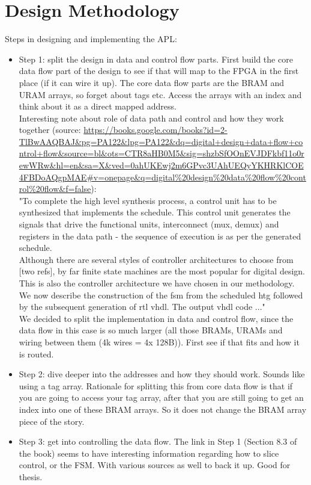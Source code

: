 \newpage
\section{Design Methodology}

Steps in designing and implementing the APL:
\begin{itemize}
	\item Step 1: split the design in data and control flow parts. First build the core data flow part of the design to see if that will map to the FPGA in the first place (if it can wire it up). The core data flow parts are the BRAM and URAM arrays, so forget about tags etc. Access the arrays with an index and think about it as a direct mapped address.\\

	Interesting note about role of data path and control and how they work together (source: \url{https://books.google.com/books?id=2-TlBwAAQBAJ&pg=PA122&lpg=PA122&dq=digital+design+data+flow+control+flow&source=bl&ots=CTR8aHB0M5&sig=shzbSfOOnEVJDFkbf11o0rewWRw&hl=en&sa=X&ved=0ahUKEwj2m6GPvc3UAhUEQyYKHRKlCOE4FBDoAQgpMAE#v=onepage&q=digital%20design%20data%20flow%20control%20flow&f=false}):\\
	"To complete the high level synthesis process, a control unit has to be synthesized that implements the schedule. This control unit generates the signals that drive the functional units, interconnect (mux, demux) and registers in the data path - the sequence of execution is as per the generated schedule.\\
	Although there are several styles of controller architectures to choose from [two refs], by far finite state machines are the most popular for digital design. This is also the controller architecture we have chosen in our methodology. We now describe the construction of the fsm from the scheduled htg followed by the subsequent generation of rtl vhdl. The output vhdl code ..."\\

	We decided to split the implementation in data and control flow, since the data flow in this case is so much larger (all those BRAMs, URAMs and wiring between them (4k wires = 4x 128B)). First see if that fits and how it is routed.
	\item Step 2: dive deeper into the addresses and how they should work. Sounds like using a tag array. Rationale for splitting this from core data flow is that if you are going to access your tag array, after that you are still going to get an index into one of these BRAM arrays. So it does not change the BRAM array piece of the story.
	\item Step 3: get into controlling the data flow. The link in Step 1 (Section 8.3 of the book) seems to have interesting information regarding how to slice control, or the FSM. With various sources as well to back it up. Good for thesis.
\end{itemize}

